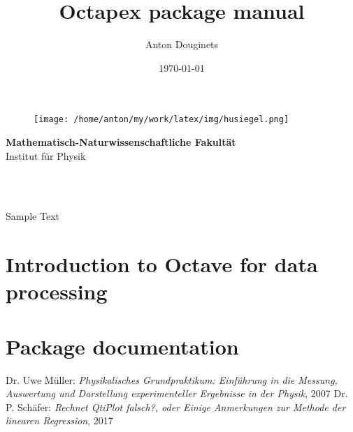\documentclass[a4paper,12pt]{article}
\title{Octapex package manual}
\author{Anton Douginets}
\date{\today}
\begin{document}
	\begin{titlepage}
		\thispagestyle{empty}
		\begin{figure}
			\texttt{[image: /home/anton/my/work/latex/img/husiegel.png]}
		\end{figure}
		\vspace*{-30mm}\hspace{-6mm}\textbf{\textcolor{pantone294}{\large{Mathematisch-Naturwissenschaftliche Fakultät}}}\\
		\textcolor{pantone294}{Institut für Physik}\\
		\vspace{20mm}
		\begin{center}
			\textcolor{pantone294}{\huge{\textbf{\thetitle}}}\\\vspace*{10mm}
			\textcolor{pantone294}{\thedate}\\\vspace*{10mm}
		\end{center}
		\tableofcontents

		\vspace{1cm}
		Sample Text
	\end{titlepage}
	\makeatother
	\newpage

	\section{Introduction to Octave for data processing}

	\section{Package documentation}

	\begin{thebibliography}{}
	Dr. Uwe Müller: \textit{Physikalisches Grundpraktikum: Einführung in die Messung, Auswertung und Darstellung experimenteller Ergebnisse in der Physik}, 2007
	 Dr. P. Schäfer: \textit{Rechnet QtiPlot falsch?, oder Einige Anmerkungen zur Methode der linearen Regression}, 2017


	\end{thebibliography}
\end{document}
